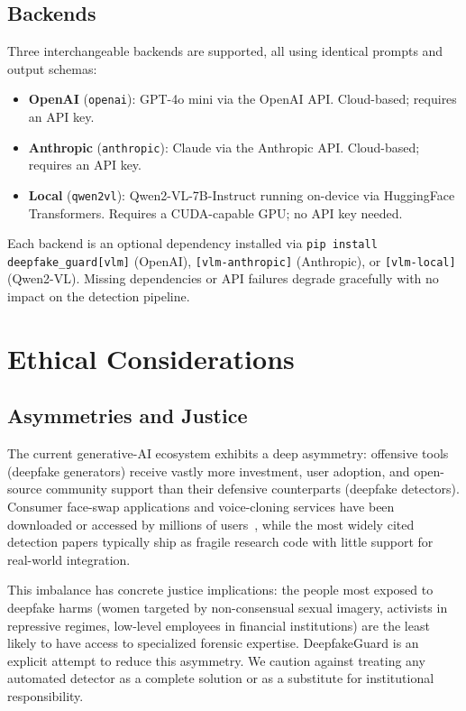 \documentclass[conference]{IEEEtran}
\begin{document}
\subsection{Backends}
Three interchangeable backends are supported, all using identical prompts and output schemas:
\begin{itemize}[leftmargin=*]
    \item \textbf{OpenAI} (\texttt{openai}): GPT-4o mini via the OpenAI API. Cloud-based; requires an API key.
    \item \textbf{Anthropic} (\texttt{anthropic}): Claude via the Anthropic API. Cloud-based; requires an API key.
    \item \textbf{Local} (\texttt{qwen2vl}): Qwen2-VL-7B-Instruct running on-device via HuggingFace Transformers. Requires a CUDA-capable GPU; no API key needed.
\end{itemize}

\noindent Each backend is an optional dependency installed via \texttt{pip install deepfake\_guard[vlm]} (OpenAI), \texttt{[vlm-anthropic]} (Anthropic), or \texttt{[vlm-local]} (Qwen2-VL). Missing dependencies or API failures degrade gracefully with no impact on the detection pipeline.

\FloatBarrier

\section{Ethical Considerations} \label{sec:ethics}

\subsection{Asymmetries and Justice}
The current generative-AI ecosystem exhibits a deep asymmetry: offensive tools (deepfake generators) receive vastly more investment, user adoption, and open-source community support than their defensive counterparts (deepfake detectors). Consumer face-swap applications and voice-cloning services have been downloaded or accessed by millions of users~\cite{sensity2024}, while the most widely cited detection papers typically ship as fragile research code with little support for real-world integration.

This imbalance has concrete justice implications: the people most exposed to deepfake harms (women targeted by non-consensual sexual imagery, activists in repressive regimes, low-level employees in financial institutions) are the least likely to have access to specialized forensic expertise. DeepfakeGuard is an explicit attempt to reduce this asymmetry. We caution against treating any automated detector as a complete solution or as a substitute for institutional responsibility.
\end{document}
